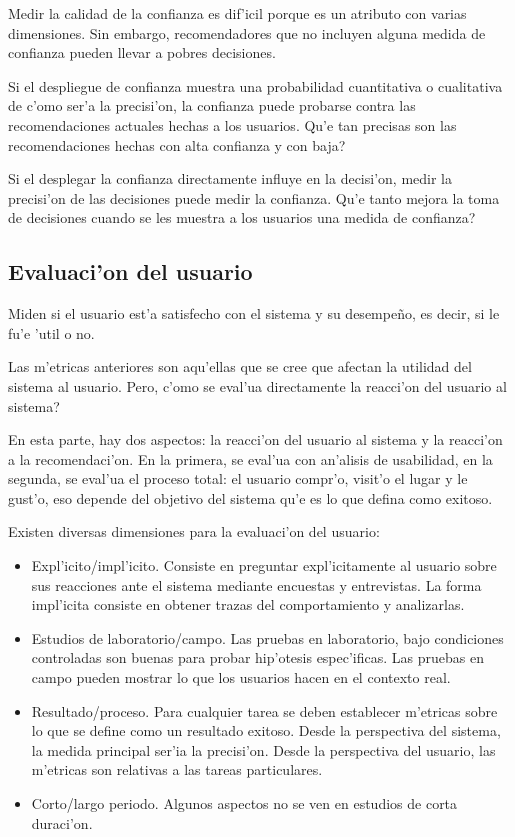 \documentclass[11pt]{article}
\begin{document}
Medir la calidad de la confianza es dif'icil porque es un atributo con varias dimensiones. Sin embargo, recomendadores que no incluyen alguna medida de confianza pueden llevar a pobres decisiones. 

Si el despliegue de confianza muestra una probabilidad cuantitativa o cualitativa de c'omo ser'a la precisi'on, la confianza puede probarse contra las recomendaciones actuales hechas a los usuarios. \textquestiondown Qu'e tan precisas son las recomendaciones hechas con alta confianza y con baja? 

Si el desplegar la confianza directamente influye en la decisi'on, medir la precisi'on de las decisiones puede medir la confianza. \textquestiondown Qu'e tanto mejora la toma de decisiones cuando se les muestra a los usuarios una medida de confianza?

\subsection{Evaluaci'on del usuario}
Miden si el usuario est'a satisfecho con el sistema y su desempe\~{n}o, es decir, si le fu'e 'util o no. 

Las m'etricas anteriores son aqu'ellas que se cree que afectan la utilidad del sistema al usuario. Pero, \textquestiondown c'omo se eval'ua directamente la reacci'on del usuario al sistema?

En esta parte, hay dos aspectos: la reacci'on del usuario al sistema y la reacci'on a la recomendaci'on. En la primera, se eval'ua con an'alisis de usabilidad, en la segunda, se eval'ua el proceso total: el usuario compr'o, visit'o el lugar y le gust'o, eso depende del objetivo del sistema qu'e es lo que defina como exitoso.

Existen diversas dimensiones para la evaluaci'on del usuario:
\begin{itemize}
\item Expl'icito/impl'icito. Consiste en preguntar expl'icitamente al usuario sobre sus reacciones ante el sistema mediante encuestas y entrevistas. La forma impl'icita consiste en obtener trazas del comportamiento y analizarlas.
\item Estudios de laboratorio/campo. Las pruebas en laboratorio, bajo condiciones controladas son buenas para probar hip'otesis espec'ificas. Las pruebas en campo pueden mostrar lo que los usuarios hacen en el contexto real.
\item Resultado/proceso. Para cualquier tarea se deben establecer m'etricas sobre lo que se define como un resultado exitoso. Desde la perspectiva del sistema, la medida principal ser'ia la precisi'on. Desde la perspectiva del usuario, las m'etricas son relativas a las tareas particulares.
\item Corto/largo periodo. Algunos aspectos no se ven en estudios de corta duraci'on. 
\end{itemize}
\end{document}
